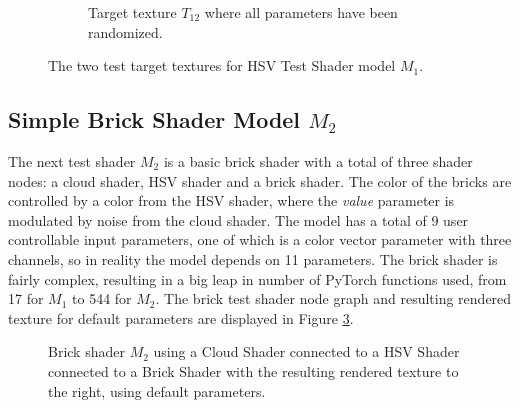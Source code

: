 \begin{figure}[!h]
\begin{subfigure}{.25\textwidth}
    \caption{Target texture $T_ {12}$ where all parameters have been randomized.}
    \label{fig:TargetsHSVShaderModelRandom}
\end{subfigure}
\caption{The two test target textures for HSV Test Shader model $M_1$.}
\label{fig:TargetsHSVShaderModel}
\end{figure}

\subsection{Simple Brick Shader Model $M_2$}
The next test shader $M_2$ is a basic brick shader with a total of three shader nodes: a cloud shader, HSV shader and a brick shader. The color of the bricks are controlled by a color from the HSV shader, where the \textit{value} parameter is modulated by noise from the cloud shader. The model has a total of 9 user controllable input parameters, one of which is a color vector parameter with three channels, so in reality the model depends on 11 parameters. The brick shader is fairly complex, resulting in a big leap in number of PyTorch functions used, from 17 for $M_1$ to 544 for $M_2$. The brick test shader node graph and resulting rendered texture for default parameters are displayed in Figure \ref{fig:M2NodeGraphAndDefaultRender}.

\begin{figure}[!h]
    \centering
    \caption{Brick shader $M_2$ using a Cloud Shader connected to a HSV Shader connected to a Brick Shader with the resulting rendered texture to the right, using default parameters. }
    \label{fig:M2NodeGraphAndDefaultRender}
\end{figure}

